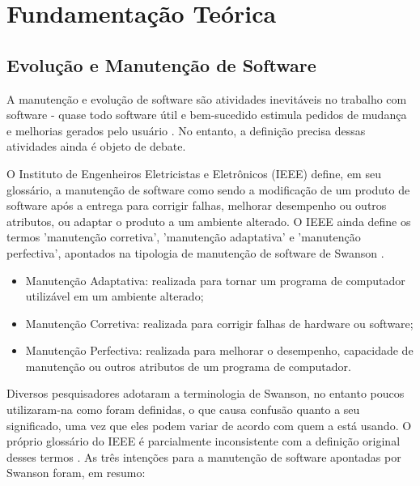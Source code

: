 \chapter[Fundamentação Teórica]{Fundamentação Teórica}

\section{Evolução e Manutenção de Software}



A manutenção e evolução de software são atividades inevitáveis no trabalho com software - 
quase todo software útil e bem-sucedido estimula pedidos de mudança e melhorias gerados pelo usuário \cite{bennett2000software}. 
No entanto, a definição precisa dessas atividades ainda é objeto de debate.

O Instituto de Engenheiros Eletricistas e Eletrônicos (IEEE) define, em seu glossário, 
a manutenção de software como sendo a modificação de um produto de software após a entrega para 
corrigir falhas, melhorar desempenho ou outros atributos, ou adaptar o produto a um ambiente alterado. 
O IEEE ainda define os termos 'manutenção corretiva', 'manutenção adaptativa' e 'manutenção perfectiva', 
apontados na tipologia de manutenção de software de Swanson \cite{1990IEEESGo, swanson1976dimensions}.

\begin{itemize}
    \item Manutenção Adaptativa: realizada para tornar um programa de computador utilizável em um ambiente alterado;
    \item Manutenção Corretiva: realizada para corrigir falhas de hardware ou software;
    \item Manutenção Perfectiva: realizada para melhorar o desempenho, capacidade de manutenção ou outros atributos de um programa de computador.
\end{itemize}

Diversos pesquisadores adotaram a terminologia de Swanson, no entanto poucos utilizaram-na como foram 
definidas, o que causa confusão quanto a seu significado, uma vez que eles podem variar de acordo com 
quem a está usando. O próprio glossário do IEEE é parcialmente inconsistente com a definição original 
desses termos \cite{chapin2001types}. As três intenções para a manutenção de software 
apontadas por Swanson foram, em resumo:

